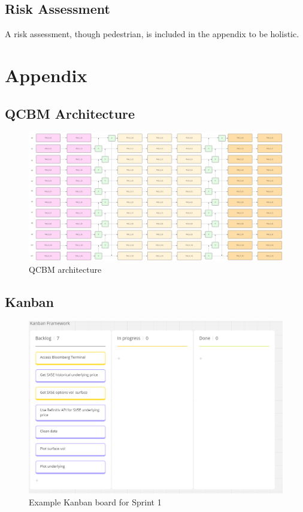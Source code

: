 \documentclass[12pt]{article}
\numberwithin{equation}{section}
\begin{document}
\subsection{Risk Assessment}
A risk assessment, though pedestrian, is included in the appendix to be holistic.\\
\clearpage


\printbibliography

\clearpage
\section{Appendix}
\subsection{QCBM Architecture}

\begin{figure}[h]
    \centering
    \includegraphics[scale=0.3, angle=270, width=\textwidth-209]{qcbm1.png}
    \caption{QCBM architecture}
\end{figure}
\clearpage
\subsection{Kanban}
\begin{figure}[h]
    \centering
    \includegraphics[scale=0.75]{Kanban.png}
    \caption{Example Kanban board for Sprint 1}
\end{figure}
\clearpage
\end{document}
